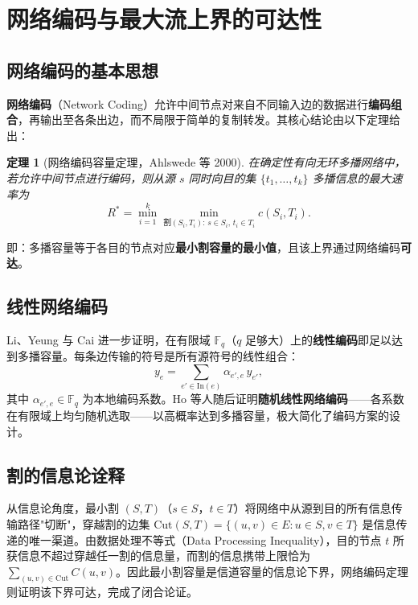\documentclass[12pt, a4paper]{article}
\newtheorem{theorem}{定理}[section]
\begin{document}
\section{网络编码与最大流上界的可达性}

\subsection{网络编码的基本思想}

\textbf{网络编码}（Network Coding）允许中间节点对来自不同输入边的数据进行\textbf{编码组合}，再输出至各条出边，而不局限于简单的复制转发。其核心结论由以下定理给出：

\begin{theorem}[网络编码容量定理，Ahlswede 等 2000]\label{thm:nc}
在确定性有向无环多播网络中，若允许中间节点进行编码，则从源 $s$ 同时向目的集 $\{t_1,\ldots,t_k\}$ 多播信息的最大速率为
\[
  R^* = \min_{i=1}^{k} \min_{\text{割}(S_i,T_i):\,s\in S_i,\,t_i\in T_i} c(S_i, T_i).
\]
\end{theorem}

即：多播容量等于各目的节点对应\textbf{最小割容量的最小值}，且该上界通过网络编码\textbf{可达}\cite{ahlswede2000network}。

\subsection{线性网络编码}

Li、Yeung 与 Cai 进一步证明，在有限域 $\mathbb{F}_q$（$q$ 足够大）上的\textbf{线性编码}即足以达到多播容量\cite{li2003linear}。每条边传输的符号是所有源符号的线性组合：
\[
  y_e = \sum_{e'\in\text{In}(e)} \alpha_{e',e}\, y_{e'},
\]
其中 $\alpha_{e',e}\in\mathbb{F}_q$ 为本地编码系数。Ho 等人随后证明\textbf{随机线性网络编码}——各系数在有限域上均匀随机选取——以高概率达到多播容量\cite{ho2006random}，极大简化了编码方案的设计。

\subsection{割的信息论诠释}

从信息论角度，最小割 $(S, T)$（$s\in S$，$t\in T$）将网络中从源到目的所有信息传输路径"切断"，穿越割的边集 $\text{Cut}(S,T) = \{(u,v)\in E : u\in S, v\in T\}$ 是信息传递的唯一渠道。由数据处理不等式（Data Processing Inequality），目的节点 $t$ 所获信息不超过穿越任一割的信息量，而割的信息携带上限恰为 $\sum_{(u,v)\in\text{Cut}} C(u,v)$。因此最小割容量是信道容量的信息论下界，网络编码定理则证明该下界可达，完成了闭合论证。
\end{document}

